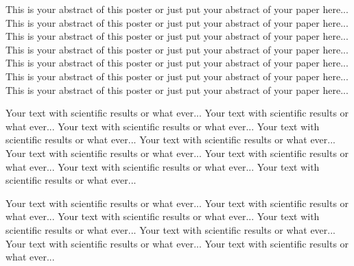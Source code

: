 \documentclass[landscape,a0b,final]{a0poster}
\newenvironment{poster}{
  \begin{center}
  \begin{minipage}[c]{0.98\textwidth}
}{
  \end{minipage} 
  \end{center}
}
\newenvironment{pcolumn}[1]{
  \begin{minipage}{#1\textwidth}
  \begin{center}
}{
  \end{center}
  \end{minipage}
}
\newcommand{\pbox}[4]{
	\psshadowbox[#3]{
		\begin{minipage}[t][#2][t]{#1} #4
		\end{minipage}
	}
}
\begin{document}
\begin{poster}
\begin{center}
\begin{pcolumn}{0.32}
{%
\begin{center}\pbox{0.8\textwidth}{}{linewidth=2mm,framearc=0.1,linecolor=lightblue,fillstyle=gradient,gradangle=0,gradbegin=white,gradend=whiteblue,gradmidpoint=1.0,framesep=1em}{\begin{center}Abstract\end{center}}\end{center}
\vspace{1.25cm}

This is your abstract of this poster or just put your abstract of your
paper here... This is your abstract of this poster or just put your
abstract of your paper here... This is your abstract of this poster or
just put your abstract of your paper here... This is your abstract of
this poster or just put your abstract of your paper here... This is
your abstract of this poster or just put your abstract of your paper
here... This is your abstract of this poster or just put your abstract
of your paper here... This is your abstract of this poster or just put
your abstract of your paper here...



\vspace{2cm}\begin{center}\pbox{0.8\textwidth}{}{linewidth=2mm,framearc=0.1,linecolor=lightblue,fillstyle=gradient,gradangle=0,gradbegin=white,gradend=whiteblue,gradmidpoint=1.0,framesep=1em}{\begin{center}Introduction\end{center}}\end{center}\vspace{1.25cm}

Your text with scientific results or what ever... Your text with
scientific results or what ever... Your text with scientific results or
what ever... Your text with scientific results or what ever... Your
text with scientific results or what ever... Your text with scientific
results or what ever... Your text with scientific results or what
ever... Your text with scientific results or what ever... Your text
with scientific results or what ever...

Your text with scientific results or what ever... Your text with
scientific results or what ever... Your text with scientific results or
what ever... Your text with scientific results or what ever... Your
text with scientific results or what ever... Your text with scientific
results or what ever... Your text with scientific results or what
ever...
}
\end{pcolumn}
\begin{pcolumn}{0.32}
\pbox{0.9\textwidth}{30cm}{linewidth=2mm,framearc=0.1,linecolor=lightblue,fillstyle=gradient,gradangle=0,gradbegin=white,gradend=white,gradmidpoint=1.0,framesep=1em}{

}
\end{pcolumn}
\end{center}
\end{poster}
\end{document}
